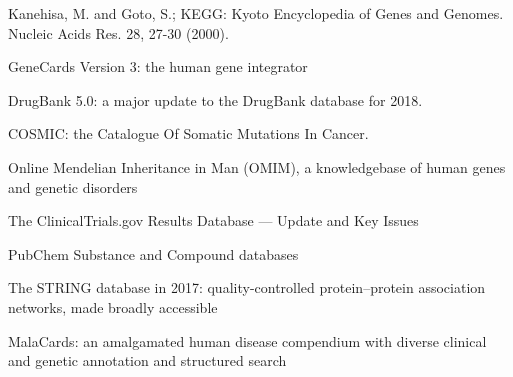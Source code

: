  Kanehisa, M. and Goto, S.; 
\newblock KEGG: Kyoto Encyclopedia of Genes and Genomes. 
\newblock Nucleic Acids Res. 28, 27-30 (2000).

GeneCards Version 3: the human gene integrator

 DrugBank 5.0: a major update to the DrugBank database for 2018.

 COSMIC: the Catalogue Of Somatic Mutations In Cancer.

 Online Mendelian Inheritance in Man (OMIM), a knowledgebase of human genes and genetic disorders

 The ClinicalTrials.gov Results Database — Update and Key Issues

 PubChem Substance and Compound databases

 The STRING database in 2017: quality-controlled protein–protein association networks, made broadly accessible

 MalaCards: an amalgamated human disease compendium with diverse clinical and genetic annotation and structured search
